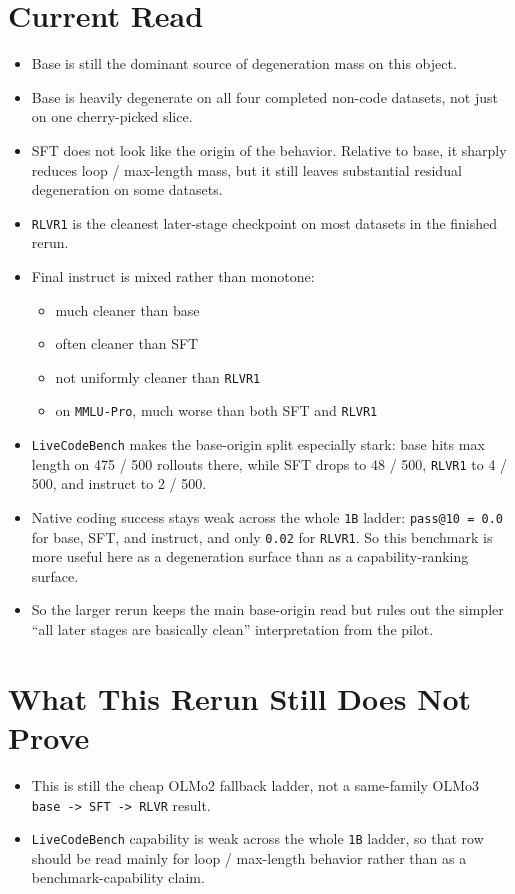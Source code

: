 \documentclass[11pt]{article}
\begin{document}
\section*{Current Read}
\begin{itemize}[leftmargin=1.5em]
\item Base is still the dominant source of degeneration mass on this object.
\item Base is heavily degenerate on all four completed non-code datasets, not just on one cherry-picked slice.
\item SFT does not look like the origin of the behavior. Relative to base, it sharply reduces loop / max-length mass, but it still leaves substantial residual degeneration on some datasets.
\item \texttt{RLVR1} is the cleanest later-stage checkpoint on most datasets in the finished rerun.
\item Final instruct is mixed rather than monotone:
  \begin{itemize}[leftmargin=1.5em]
  \item much cleaner than base
  \item often cleaner than SFT
  \item not uniformly cleaner than \texttt{RLVR1}
  \item on \texttt{MMLU-Pro}, much worse than both SFT and \texttt{RLVR1}
  \end{itemize}
\item \texttt{LiveCodeBench} makes the base-origin split especially stark: base hits max length on 475 / 500 rollouts there, while SFT drops to 48 / 500, \texttt{RLVR1} to 4 / 500, and instruct to 2 / 500.
\item Native coding success stays weak across the whole \texttt{1B} ladder: \texttt{pass@10 = 0.0} for base, SFT, and instruct, and only \texttt{0.02} for \texttt{RLVR1}. So this benchmark is more useful here as a degeneration surface than as a capability-ranking surface.
\item So the larger rerun keeps the main base-origin read but rules out the simpler ``all later stages are basically clean'' interpretation from the pilot.
\end{itemize}

\section*{What This Rerun Still Does Not Prove}
\begin{itemize}[leftmargin=1.5em]
\item This is still the cheap OLMo2 fallback ladder, not a same-family OLMo3 \texttt{base -> SFT -> RLVR} result.
\item \texttt{LiveCodeBench} capability is weak across the whole \texttt{1B} ladder, so that row should be read mainly for loop / max-length behavior rather than as a benchmark-capability claim.
\end{itemize}
\end{document}
